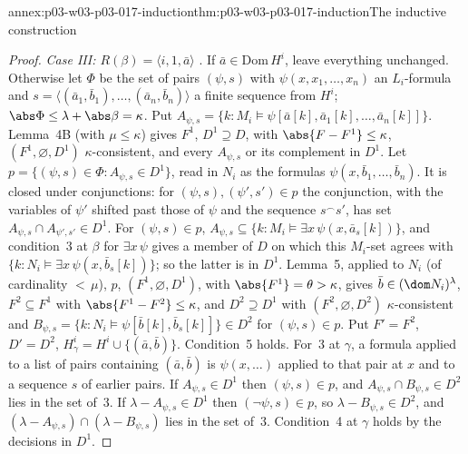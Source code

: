 \begin{annexitem}{annex:p03-w03-p03-017-induction}{thm:p03-w03-p03-017-induction}{The inductive construction}
\begin{proof}
\emph{Case III: \(R(\beta)=\langle i,1,\bar a\rangle\)} \cite[p.~232]{Shelah1971Ultrapowers}.
If \(\bar a\in\mathrm{Dom}\,H^i\), leave everything unchanged.  Otherwise let
\(\Phi\) be the set of pairs \((\psi,s)\) with \(\psi(x,x_1,\ldots,x_n)\) an
\(L_i\)-formula and \(s=\langle(\bar a_1,\bar b_1),\ldots,(\bar a_n,\bar
b_n)\rangle\) a finite sequence from \(H^i\); \(\abs\Phi\le\lambda+\abs\beta=
\kappa\).  Put
\(A_{\psi,s}=\{k:M_i\models\psi[\bar a[k],\bar a_1[k],\ldots,\bar a_n[k]]\}\).
Lemma~4B (with \(\mu\le\kappa\)) gives \(F^1\), \(D^1\supseteq D\), with
\(\abs{F-F^1}\le\kappa\), \((F^1,\varnothing,D^1)\) \(\kappa\)-consistent, and
every \(A_{\psi,s}\) or its complement in \(D^1\).  Let
\(p=\{(\psi,s)\in\Phi:A_{\psi,s}\in D^1\}\), read in \(N_i\) as the formulas
\(\psi(x,\bar b_1,\ldots,\bar b_n)\).  It is closed under conjunctions: for
\((\psi,s),(\psi',s')\in p\) the conjunction, with the variables of \(\psi'\)
shifted past those of \(\psi\) and the sequence \(s^\frown s'\), has set
\(A_{\psi,s}\cap A_{\psi',s'}\in D^1\).  For \((\psi,s)\in p\),
\(A_{\psi,s}\subseteq\{k:M_i\models\exists x\,\psi(x,\bar a_s[k])\}\), and
condition~3 at \(\beta\) for \(\exists x\,\psi\) gives a member of \(D\) on
which this \(M_i\)-set agrees with
\(\{k:N_i\models\exists x\,\psi(x,\bar b_s[k])\}\); so the latter is in
\(D^1\).  Lemma~5, applied to \(N_i\) (of cardinality \({<}\,\mu\)), \(p\),
\((F^1,\varnothing,D^1)\), with \(\abs{F^1}=\theta>\kappa\), gives
\(\bar b\in(\dom N_i)^\lambda\), \(F^2\subseteq F^1\) with
\(\abs{F^1-F^2}\le\kappa\), and \(D^2\supseteq D^1\) with
\((F^2,\varnothing,D^2)\) \(\kappa\)-consistent and
\(B_{\psi,s}=\{k:N_i\models\psi[\bar b[k],\bar b_s[k]]\}\in D^2\) for
\((\psi,s)\in p\).  Put \(F'=F^2\), \(D'=D^2\), \(H^i_\gamma=H^i\cup\{(\bar
a,\bar b)\}\).  Condition~5 holds.  For~3 at \(\gamma\), a formula applied to
a list of pairs containing \((\bar a,\bar b)\) is \(\psi(x,\ldots)\) applied
to that pair at \(x\) and to a sequence \(s\) of earlier pairs.  If
\(A_{\psi,s}\in D^1\) then \((\psi,s)\in p\), and \(A_{\psi,s}\cap B_{\psi,s}
\in D^2\) lies in the set of~3.  If \(\lambda-A_{\psi,s}\in D^1\) then
\((\neg\psi,s)\in p\), so \(\lambda-B_{\psi,s}\in D^2\), and
\((\lambda-A_{\psi,s})\cap(\lambda-B_{\psi,s})\) lies in the set of~3.
Condition~4 at \(\gamma\) holds by the decisions in \(D^1\).


\end{proof}
\end{annexitem}
